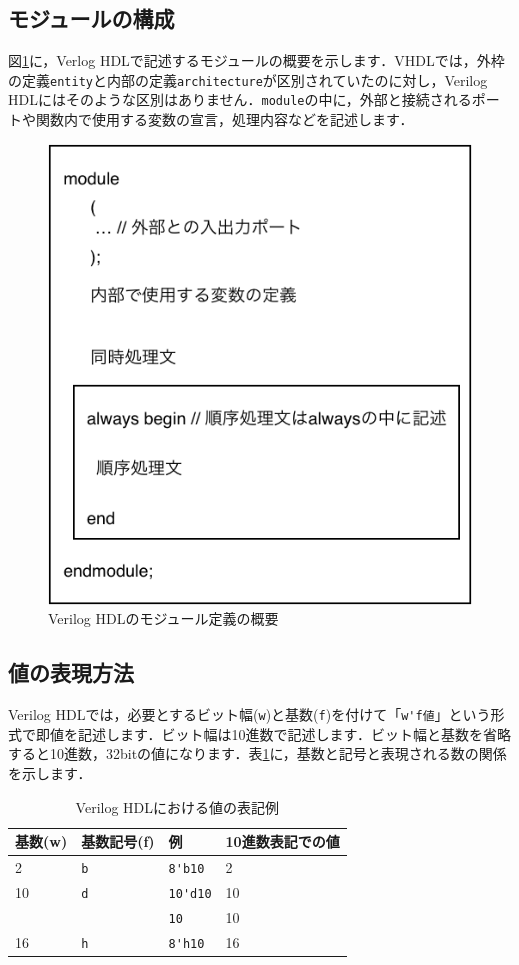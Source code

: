 \documentclass[a4paper,dvipdfmx]{jsarticle}
\begin{document}
\subsection{モジュールの構成}
図\ref{fig:verilog_module_overview}に，Verlog HDLで記述するモジュールの概要を示します．VHDLでは，外枠の定義\verb|entity|と内部の定義\verb|architecture|が区別されていたのに対し，Verilog HDLにはそのような区別はありません．\verb|module|の中に，外部と接続されるポートや関数内で使用する変数の宣言，処理内容などを記述します．

 \begin{figure}[H]
  \begin{center}
   \includegraphics[width=.4\textwidth]{chapter02_figures/verilog_module_overview.png}
  \end{center}
  \caption{Verilog HDLのモジュール定義の概要 \label{fig:verilog_module_overview}}
 \end{figure}

\subsection{値の表現方法}
Verilog HDLでは，必要とするビット幅(\verb|w|)と基数(\verb|f|)を付けて「\verb|w'f値|」という形式で即値を記述します．ビット幅は10進数で記述します．ビット幅と基数を省略すると10進数，32bitの値になります．表\ref{tbl:verilog_value}に，基数と記号と表現される数の関係を示します．

\begin{table}[H]
\begin{center}
 \begin{tabular}{l|l|l|l}
 \hline
  基数(w) & 基数記号(f) & 例            & 10進数表記での値 \\\hline\hline
  2       & \verb|b|    & \verb|8'b10|  & 2 \\\hline
  10      & \verb|d|    & \verb|10'd10| & 10 \\\hline
          &             & \verb|10|     & 10 \\\hline
  16      & \verb|h|    & \verb|8'h10|  & 16 \\\hline
 \end{tabular}
\end{center}
\caption{Verilog HDLにおける値の表記例\label{tbl:verilog_value}}
\end{table}
\end{document}
